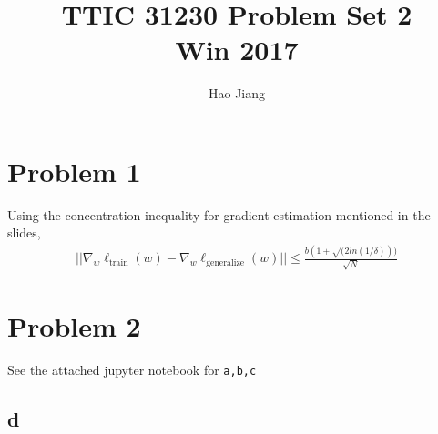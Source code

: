 \documentclass{article}
\title{TTIC 31230 Problem Set 2 \\ Win 2017}
\author{Hao Jiang}
\begin{document}
\maketitle

\section*{Problem 1}
Using the concentration inequality for gradient estimation mentioned in the
slides,
\begin{align*}
||\nabla_w\ell_{\text{train}}(w) - \nabla_w \ell_{\text{generalize}}(w)|| \leq
\frac{b(1+\sqrt(2ln(1/\delta)))}{\sqrt{N}}
\end{align*}
\section*{Problem 2}
See the attached jupyter notebook for \texttt{a,b,c}

\subsection{d}
\end{document}
